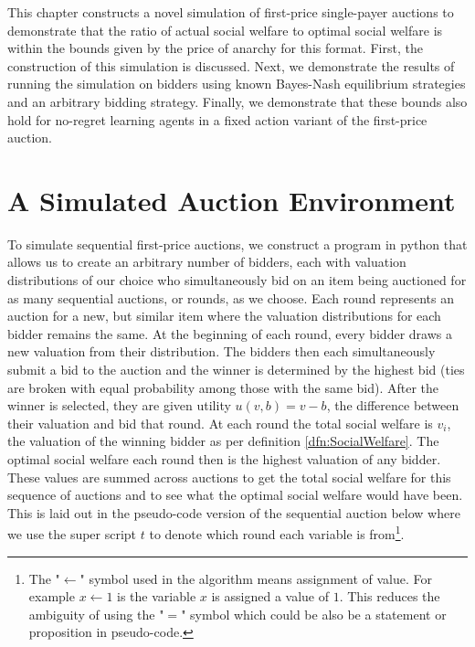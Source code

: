 \documentclass[12pt,twoside]{reedthesis}
\begin{document}
This chapter constructs a novel simulation of first-price single-payer auctions to demonstrate that the ratio of actual social welfare to optimal social welfare is within the bounds given by the price of anarchy for this format. First, the construction of this simulation is discussed. Next, we demonstrate the results of running the simulation on bidders using known Bayes-Nash equilibrium strategies and an arbitrary bidding strategy. Finally, we demonstrate that these bounds also hold for no-regret learning agents in a fixed action variant of the first-price auction.

\section{A Simulated Auction Environment}

To simulate sequential first-price auctions, we construct a program in python that allows us to create an arbitrary number of bidders, each with valuation distributions of our choice who simultaneously bid on an item being auctioned for as many sequential auctions, or rounds, as we choose. Each round represents an auction for a new, but similar item where the valuation distributions for each bidder remains the same. At the beginning of each round, every bidder draws a new valuation from their distribution. The bidders then each simultaneously submit a bid to the auction and the winner is determined by the highest bid (ties are broken with equal probability among those with the same bid). After the winner is selected, they are given utility $u(v, b) = v - b$, the difference between their valuation and bid that round. At each round the total social welfare is $v_i$, the valuation of the winning bidder as per definition \ref{dfn:SocialWelfare}. The optimal social welfare each round then is the highest valuation of any bidder. These values are summed across auctions to get the total social welfare for this sequence of auctions and to see what the optimal social welfare would have been. This is laid out in the pseudo-code version of the sequential auction below where we use the super script $t$ to denote which round each variable is from\footnote{The "$\leftarrow$" symbol used in the algorithm means assignment of value. For example $x \leftarrow 1$ is the variable $x$ is assigned a value of $1$. This reduces the ambiguity of using the "$=$" symbol which could be also be a statement or proposition in pseudo-code.}.\\
\end{document}
